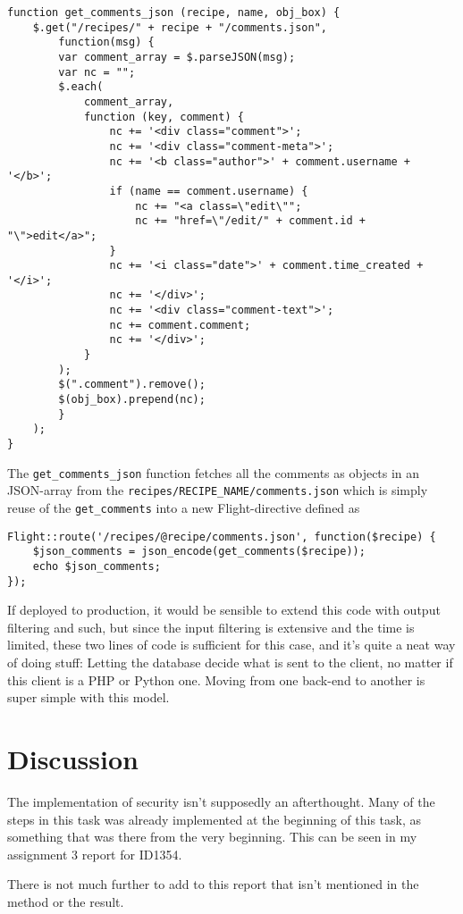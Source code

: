 \documentclass[a4paper]{scrartcl}
\begin{document}
\begin{lstlisting}
function get_comments_json (recipe, name, obj_box) {
	$.get("/recipes/" + recipe + "/comments.json",
		function(msg) {
		var comment_array = $.parseJSON(msg);
		var nc = "";
		$.each(
			comment_array,
			function (key, comment) {
				nc += '<div class="comment">';
				nc += '<div class="comment-meta">';
				nc += '<b class="author">' + comment.username + '</b>';
				if (name == comment.username) {
					nc += "<a class=\"edit\"";
					nc += "href=\"/edit/" + comment.id + "\">edit</a>";
				}
				nc += '<i class="date">' + comment.time_created + '</i>';
				nc += '</div>';
				nc += '<div class="comment-text">';
				nc += comment.comment;
				nc += '</div>';
			}
		);
		$(".comment").remove();
		$(obj_box).prepend(nc);
		}
	);
}
\end{lstlisting}

The \texttt{get\_comments\_json} function fetches all the comments as objects in an JSON-array from the \texttt{recipes/RECIPE\_NAME/comments.json} which is simply reuse of the \texttt{get\_comments} into a new Flight-directive defined as

\begin{lstlisting}
Flight::route('/recipes/@recipe/comments.json', function($recipe) {
	$json_comments = json_encode(get_comments($recipe));
	echo $json_comments;
});
\end{lstlisting}

If deployed to production, it would be sensible to extend this code with output filtering and such, but since the input filtering is extensive and the time is limited, these two lines of code is sufficient for this case, and it's quite a neat way of doing stuff: Letting the database decide what is sent to the client, no matter if this client is a PHP or Python one. Moving from one back-end to another is super simple with this model.

\newpage
\section{Discussion}

The implementation of security isn't supposedly an afterthought. Many of the steps in this task was already implemented at the beginning of this task, as something that was there from the very beginning. This can be seen in my assignment 3 report for ID1354.

There is not much further to add to this report that isn't mentioned in the method or the result.
\end{document}
